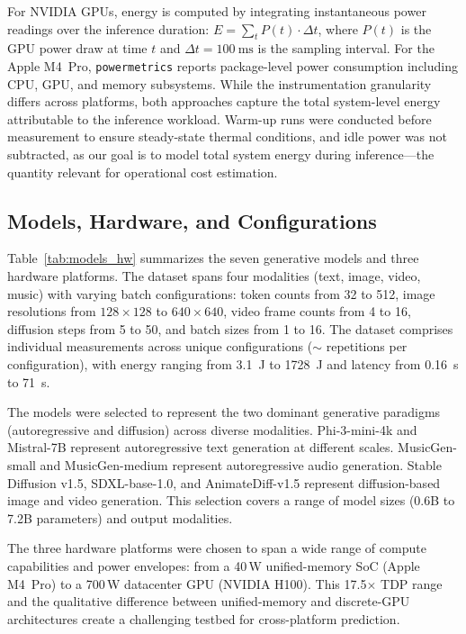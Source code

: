 \documentclass[preprint,review,12pt]{elsarticle}
\begin{document}
For NVIDIA GPUs, energy is computed by integrating instantaneous power readings over the inference duration: $E = \sum_{t} P(t) \cdot \Delta t$, where $P(t)$ is the GPU power draw at time $t$ and $\Delta t = \SI{100}{\milli\second}$ is the sampling interval.
For the Apple M4~Pro, \texttt{powermetrics} reports package-level power consumption including CPU, GPU, and memory subsystems.
While the instrumentation granularity differs across platforms, both approaches capture the total system-level energy attributable to the inference workload.
Warm-up runs were conducted before measurement to ensure steady-state thermal conditions, and idle power was not subtracted, as our goal is to model total system energy during inference---the quantity relevant for operational cost estimation.

\subsection{Models, Hardware, and Configurations}
\label{sec:models_hw}
Table~\ref{tab:models_hw} summarizes the seven generative models and three hardware platforms.
The dataset spans four modalities (text, image, video, music) with varying batch configurations: token counts from 32 to 512, image resolutions from $128{\times}128$ to $640{\times}640$, video frame counts from 4 to 16, diffusion steps from 5 to 50, and batch sizes from 1 to 16.
The dataset comprises \unskip{} individual measurements across \unskip{} unique configurations (${\sim}$\unskip{} repetitions per configuration), with energy ranging from \SI{3.1}{\joule} to \SI{1728}{\joule} and latency from \SI{0.16}{\second} to \SI{71}{\second}.

The models were selected to represent the two dominant generative paradigms (autoregressive and diffusion) across diverse modalities.
Phi-3-mini-4k and Mistral-7B represent autoregressive text generation at different scales.
MusicGen-small and MusicGen-medium represent autoregressive audio generation.
Stable Diffusion v1.5, SDXL-base-1.0, and AnimateDiff-v1.5 represent diffusion-based image and video generation.
This selection covers a range of model sizes (0.6B to 7.2B parameters) and output modalities.

The three hardware platforms were chosen to span a wide range of compute capabilities and power envelopes: from a 40\,W unified-memory SoC (Apple M4~Pro) to a 700\,W datacenter GPU (NVIDIA H100).
This 17.5$\times$ TDP range and the qualitative difference between unified-memory and discrete-GPU architectures create a challenging testbed for cross-platform prediction.
\end{document}
